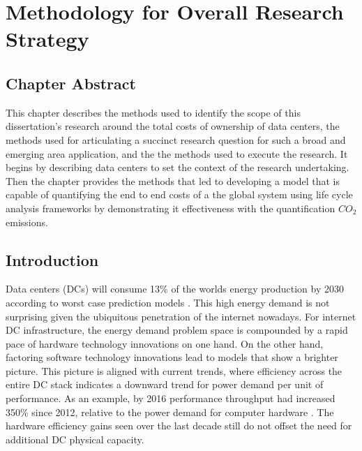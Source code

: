 \chapter{Methodology for Overall Research Strategy}

\section{Chapter Abstract}

This chapter describes the methods used to identify the scope of this dissertation's research around the total costs of ownership of data centers, the methods used for articulating a succinct research question for such a broad and emerging area application, and the the methods used to execute the research. It begins by describing data centers to set the context of the research undertaking. Then the chapter provides the methods that led to developing a model that is capable of quantifying the end to end costs of a the global system using life cycle analysis frameworks by demonstrating it effectiveness with the quantification $CO_2$ emissions. 

\section{Introduction}

Data centers (DCs) will consume 13\% of the worlds energy production by 2030 according to worst case prediction models \cite{andrae15}. This high energy demand is not surprising given the ubiquitous penetration of the internet nowadays. For internet DC infrastructure, the energy demand problem space is compounded by a rapid pace of hardware technology innovations on one hand. On the other hand, factoring software technology innovations lead to models that show a brighter picture. This picture is aligned with current trends, where efficiency across the entire DC stack indicates a downward trend for power demand per unit of performance. As an example, by 2016 performance throughput had increased 350\% since 2012, relative to the power demand for computer hardware \cite{GoogleEnvRpt}.  The hardware efficiency gains seen over the last decade still do not offset the need for additional DC physical capacity.

